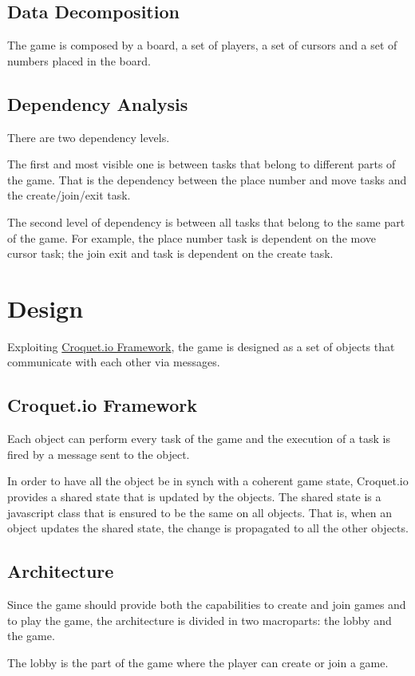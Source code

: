 \documentclass[12pt, a4paper]{report}
\begin{document}
\section{Data Decomposition}
The game is composed by a board, a set of players, a set of cursors and a set of numbers placed in the board.

\section{Dependency Analysis}
There are two dependency levels.

The first and most visible one is between tasks 
 that belong to different parts of the game. That is the dependency between the place 
 number and move tasks and the create/join/exit task.
 
The second level of dependency is between all tasks that belong to the same part of the game. For example, the place 
 number task is dependent on the move cursor task; the join exit and task is dependent on the create task.

\chapter{Design}
Exploiting \href{https://croquet.io/}{Croquet.io Framework}, the game is designed as a set of objects that communicate with each other via messages.

\section{Croquet.io Framework}
Each object can perform every task of the game and the execution of a task is fired by a message sent to the object.

In order to have all the object be in synch with a coherent game state, Croquet.io provides a shared state that is updated by the objects.
 The shared state is a javascript class that is ensured to be the same on all objects. That is, when an object updates the shared state,
 the change is propagated to all the other objects.

\section{Architecture}
Since the game should provide both the capabilities to create and join games and to play the game,
 the architecture is divided in two macroparts: the lobby and the game. 
 
The lobby is the part of the game where the player can create or join a game.
\end{document}
